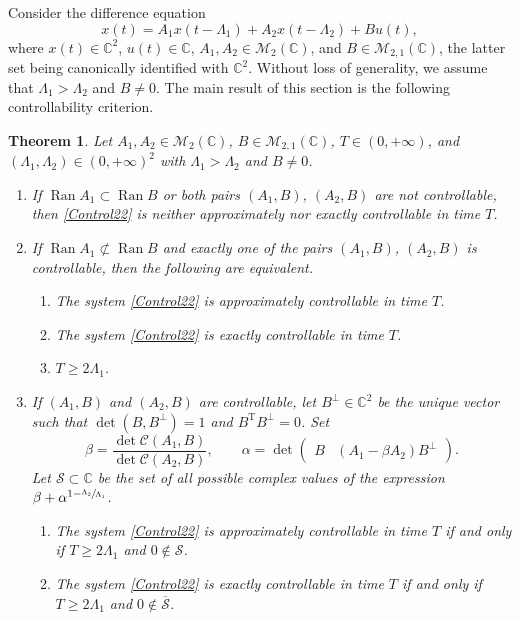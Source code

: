 \documentclass[10pt]{article}
\theoremstyle{plain}
\newtheorem{theo}{Theorem}[section]
\theoremstyle{definition}
\DeclareMathOperator{\range}{Ran}
\newcommand{\transp}{{\scriptscriptstyle\mathrm{T}}}
\numberwithin{equation}{section}\numberwithin{figure}{section}\emergencystretch=3em
\begin{document}
Consider the difference equation
\begin{equation}
\label{Control22}
x(t) = A_1 x(t - \Lambda_1) + A_2 x(t - \Lambda_2) + B u(t),
\end{equation}
where $x(t) \in \mathbb C^2$, $u(t) \in \mathbb C$, $A_1, A_2 \in \mathcal M_2(\mathbb C)$, and $B \in \mathcal M_{2, 1}(\mathbb C)$, the latter set being canonically identified with $\mathbb C^2$. Without loss of generality, we assume that $\Lambda_1 > \Lambda_2$ and $B \neq 0$. The main result of this section is the following controllability criterion.

\begin{theo}
\label{MainTheo22}
Let $A_1, A_2 \in \mathcal M_2(\mathbb C)$, $B \in \mathcal M_{2, 1}(\mathbb C)$, $T \in (0, +\infty)$, and $(\Lambda_1, \Lambda_2) \in (0, +\infty)^2$ with $\Lambda_1 > \Lambda_2$ and $B \neq 0$.
\begin{enumerate}
\item\label{MainTheoA1BNonContr} If $\range A_1 \subset \range B$ or both pairs $(A_1, B)$, $(A_2, B)$ are not controllable, then \eqref{Control22} is neither approximately nor exactly controllable in time $T$.
\item\label{MainTheoA2BNonContr} If $\range A_1 \not\subset \range B$ and exactly one of the pairs $(A_1, B)$, $(A_2, B)$ is controllable, then the following are equivalent.
\begin{enumerate}
\item The system \eqref{Control22} is approximately controllable in time $T$.
\item The system \eqref{Control22} is exactly controllable in time $T$.
\item $T \geq 2 \Lambda_{1}$.
\end{enumerate}
\item\label{MainTheoA1A2Contr} If $(A_1, B)$ and $(A_2, B)$ are controllable, let $B^\perp \in \mathbb C^2$ be the unique vector such that $\det(B, B^\perp)  = 1$ and $B^\transp B^\perp = 0$. Set
\begin{equation}
\label{DefAlphaBeta}
\beta = \frac{\det \mathcal C(A_1, B)}{\det \mathcal C(A_2, B)}, \qquad \alpha = \det \begin{pmatrix}B & (A_1 - \beta A_2) B^\perp\end{pmatrix}.
\end{equation}
Let $\mathcal S \subset \mathbb C$ be the set of all possible complex values of the expression $\beta + \alpha^{1 - \sfrac{\Lambda_{2}}{\Lambda_{1}}}$.
\begin{enumerate}
\item\label{MainTheoApprox} The system \eqref{Control22} is approximately controllable in time $T$ if and only if $T \geq 2 \Lambda_{1}$ and $0 \notin \mathcal S$.
\item\label{MainTheoExact} The system \eqref{Control22} is exactly controllable in time $T$ if and only if $T \geq 2 \Lambda_{1}$ and $0 \notin \overline{\mathcal S}$.
\end{enumerate}
\end{enumerate}
\end{theo}
\end{document}
